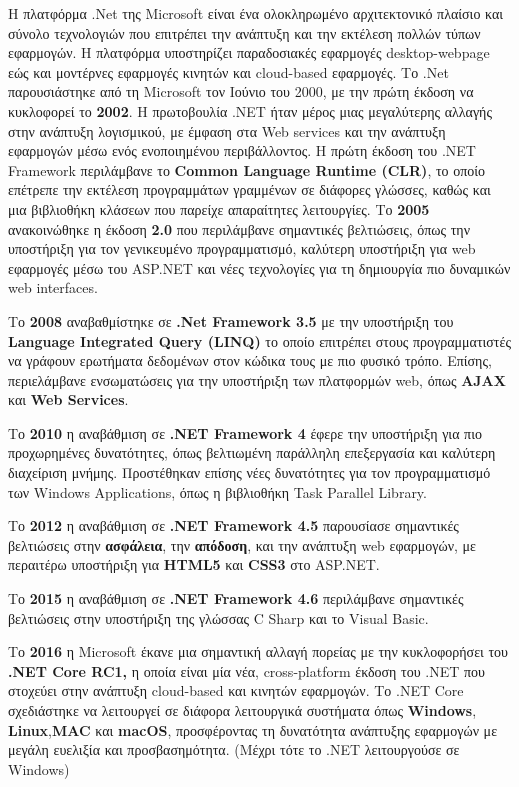 Η πλατφόρμα .Net της Microsoft είναι ένα ολοκληρωμένο αρχιτεκτονικό πλαίσιο και σύνολο τεχνολογιών που επιτρέπει την ανάπτυξη και την εκτέλεση πολλών τύπων εφαρμογών. Η πλατφόρμα υποστηρίζει παραδοσιακές εφαρμογές desktop-webpage εώς και μοντέρνες εφαρμογές κινητών και cloud-based εφαρμογές. Το .Net παρουσιάστηκε από τη Microsoft τον Ιούνιο του 2000, με την πρώτη έκδοση να κυκλοφορεί το \textbf{2002}. Η πρωτοβουλία .NET ήταν μέρος μιας μεγαλύτερης αλλαγής στην ανάπτυξη λογισμικού, με έμφαση στα Web services και την ανάπτυξη εφαρμογών μέσω ενός ενοποιημένου περιβάλλοντος. Η πρώτη έκδοση του .NET Framework περιλάμβανε το\textbf{ Common Language Runtime (CLR)}, το οποίο επέτρεπε την εκτέλεση προγραμμάτων γραμμένων σε διάφορες γλώσσες, καθώς και μια βιβλιοθήκη κλάσεων που παρείχε απαραίτητες λειτουργίες. Το \textbf{2005} ανακοινώθηκε η έκδοση \textbf{2.0} που περιλάμβανε σημαντικές βελτιώσεις, όπως την υποστήριξη για τον γενικευμένο προγραμματισμό, καλύτερη υποστήριξη για web εφαρμογές μέσω του ASP.NET και νέες τεχνολογίες για τη δημιουργία πιο δυναμικών web interfaces. 

Το \textbf{2008} αναβαθμίστηκε σε \textbf{.Net Framework 3.5} με την υποστήριξη του \textbf{Language Integrated Query (LINQ)} το οποίο επιτρέπει στους προγραμματιστές να γράφουν ερωτήματα δεδομένων στον κώδικα τους με πιο φυσικό τρόπο. Επίσης, περιελάμβανε ενσωματώσεις για την υποστήριξη των πλατφορμών web, όπως \textbf{AJAX} και \textbf{Web Services}. 

Το \textbf{2010} η αναβάθμιση σε \textbf{.NET Framework 4} έφερε την υποστήριξη για πιο προχωρημένες δυνατότητες, όπως βελτιωμένη παράλληλη επεξεργασία και καλύτερη διαχείριση μνήμης. Προστέθηκαν επίσης νέες δυνατότητες για τον προγραμματισμό των Windows Applications, όπως η βιβλιοθήκη Task Parallel Library. 

Το \textbf{2012} η αναβάθμιση σε \textbf{.NET Framework 4.5} παρουσίασε σημαντικές βελτιώσεις στην \textbf{ασφάλεια}, την \textbf{απόδοση}, και την ανάπτυξη web εφαρμογών, με περαιτέρω υποστήριξη για \textbf{HTML5} και \textbf{CSS3} στο ASP.NET.

Το \textbf{2015} η αναβάθμιση σε \textbf{.NET Framework 4.6} περιλάμβανε σημαντικές βελτιώσεις  στην υποστήριξη της γλώσσας C Sharp και το Visual Basic.

Το \textbf{2016} η Microsoft έκανε μια σημαντική αλλαγή πορείας με την κυκλοφορήσει του \textbf{ .NET Core RC1,} η οποία είναι μία νέα, cross-platform έκδοση του .NET που στοχεύει στην ανάπτυξη cloud-based και κινητών εφαρμογών. Το .NET Core σχεδιάστηκε να λειτουργεί σε διάφορα λειτουργικά συστήματα όπως \textbf{Windows}, \textbf{Linux},\textbf{MAC} και \textbf{macOS}, προσφέροντας τη δυνατότητα ανάπτυξης εφαρμογών με μεγάλη ευελιξία και προσβασημότητα. (Μέχρι τότε το .NET λειτουργούσε σε Windows)
\\[5\baselineskip]

